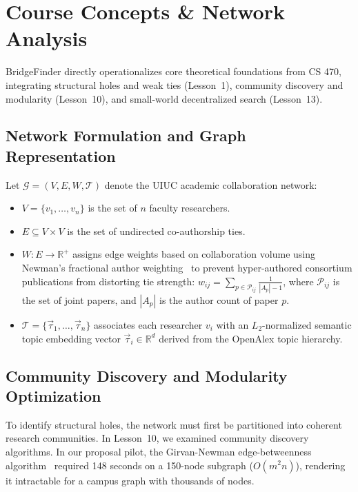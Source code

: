 \section{Course Concepts \& Network Analysis}

BridgeFinder directly operationalizes core theoretical foundations from CS 470, integrating structural holes and weak ties (Lesson~1), community discovery and modularity (Lesson~10), and small-world decentralized search (Lesson~13).

\subsection{Network Formulation and Graph Representation}
Let $\mathcal{G} = (V, E, W, \mathcal{T})$ denote the UIUC academic collaboration network:
\begin{itemize}
    \setlength{\itemsep}{0.2pt}\setlength{\parskip}{0pt}
    \item $V = \{v_1, \dots, v_n\}$ is the set of $n$ faculty researchers.
    \item $E \subseteq V \times V$ is the set of undirected co-authorship ties.
    \item $W: E \to \mathbb{R}^+$ assigns edge weights based on collaboration volume using Newman's fractional author weighting~\cite{newman2004} to prevent hyper-authored consortium publications from distorting tie strength:
    $w_{ij} = \sum_{p \in \mathcal{P}_{ij}} \frac{1}{|A_p| - 1}$, where $\mathcal{P}_{ij}$ is the set of joint papers, and $|A_p|$ is the author count of paper $p$.
    \item $\mathcal{T} = \{\vec{\tau}_1, \dots, \vec{\tau}_n\}$ associates each researcher $v_i$ with an $L_2$-normalized semantic topic embedding vector $\vec{\tau}_i \in \mathbb{R}^d$ derived from the OpenAlex topic hierarchy.
\end{itemize}

\subsection{Community Discovery and Modularity Optimization}
To identify structural holes, the network must first be partitioned into coherent research communities. In Lesson~10, we examined community discovery algorithms. In our proposal pilot, the Girvan-Newman edge-betweenness algorithm~\cite{girvan2002} required 148 seconds on a 150-node subgraph ($O(m^2 n)$), rendering it intractable for a campus graph with thousands of nodes.

